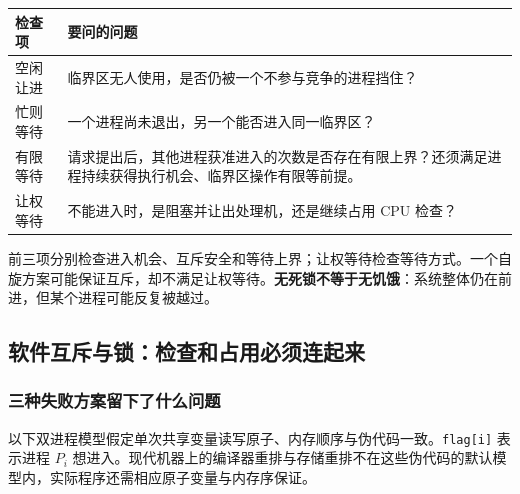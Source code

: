 \begin{wideblock}

\par\medskip\noindent\begin{minipage}{\linewidth}\fontsize{9.3}{12}\selectfont\begin{tabularx}{\linewidth}{@{}YY@{}}
\toprule\noalign{}
\begin{minipage}[b]{\linewidth}\raggedright
检查项
\end{minipage} & \begin{minipage}[b]{\linewidth}\raggedright
要问的问题
\end{minipage} \\
\midrule\noalign{}


空闲让进 & 临界区无人使用，是否仍被一个不参与竞争的进程挡住？ \\
忙则等待 & 一个进程尚未退出，另一个能否进入同一临界区？ \\
有限等待 & 请求提出后，其他进程获准进入的次数是否存在有限上界？还须满足进程持续获得执行机会、临界区操作有限等前提。 \\
让权等待 & 不能进入时，是阻塞并让出处理机，还是继续占用 CPU 检查？ \\
\bottomrule\end{tabularx}
\end{minipage}\par\medskip

\end{wideblock}

前三项分别检查进入机会、互斥安全和等待上界；让权等待检查等待方式。一个自旋方案可能保证互斥，却不满足让权等待。\textbf{无死锁不等于无饥饿}：系统整体仍在前进，但某个进程可能反复被越过。

\subsection{软件互斥与锁：检查和占用必须连起来}\label{OS02-locks}

\subsubsection{三种失败方案留下了什么问题}\label{OS02-auto-9}

以下双进程模型假定单次共享变量读写原子、内存顺序与伪代码一致。\texttt{flag[\allowbreak{}i]\allowbreak{}} 表示进程 \(P_i\) 想进入。现代机器上的编译器重排与存储重排不在这些伪代码的默认模型内，实际程序还需相应原子变量与内存序保证。

